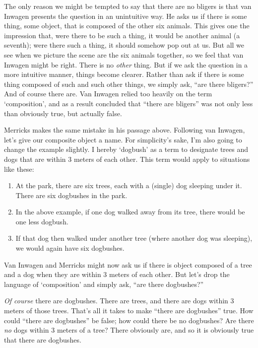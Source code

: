 \documentclass[11pt]{article}
\begin{document}
\begin{spacing}{1.25}
The only reason we might be tempted to say that there are no bligers
is that van Inwagen presents the question in an unintuitive way.  He
asks us if there is some thing, some object, that is composed of the
other six animals.  This gives one the impression that, were there to
be such a thing, it would be another animal (a seventh); were there
such a thing, it should somehow pop out at us.  But all we see when we
picture the scene are the six animals together, so we feel that van
Inwagen might be right.  There is no {\em other} thing.  But if we ask
the question in a more intuitive manner, things become clearer.
Rather than ask if there is some thing composed of such and such other
things, we simply ask, ``are there bligers?''  And of course there
are.  Van Inwagen relied too heavily on the term `composition', and as
a result concluded that ``there are bligers'' was not only less than
obviously true, but actually false.

Merricks makes the same mistake in his passage above.  Following van
Inwagen, let's give our composite object a name.  For simplicity's
sake, I'm also going to change the example slightly.  I hereby
`dogbush' as a term to designate trees and dogs that are within 3
meters of each other.  This term would apply to situations like these:

\begin{enumerate}
  \item At the park, there are six trees, each with a (single) dog
    sleeping under it.  There are six dogbushes in the park.
  \item In the above example, if one dog walked away from its tree,
    there would be one less dogbush.
  \item If that dog then walked under another tree (where another dog
    was sleeping), we would again have six dogbushes.
\end{enumerate}

Van Inwagen and Merricks might now ask us if there is object composed
of a tree and a dog when they are within 3 meters of each other.  But
let's drop the language of `composition' and simply ask, ``are there
dogbushes?''

{\em Of course} there are dogbushes.  There are trees, and there are
dogs within 3 meters of those trees.  That's all it takes to make
``there are dogbushes'' true.  How could ``there are dogbushes'' be
false; how could there be no dogbushes?  Are there {\em no} dogs
within 3 meters of a tree?  There obviously are, and so it is
obviously true that there are dogbushes.  


\end{spacing}
\end{document}
